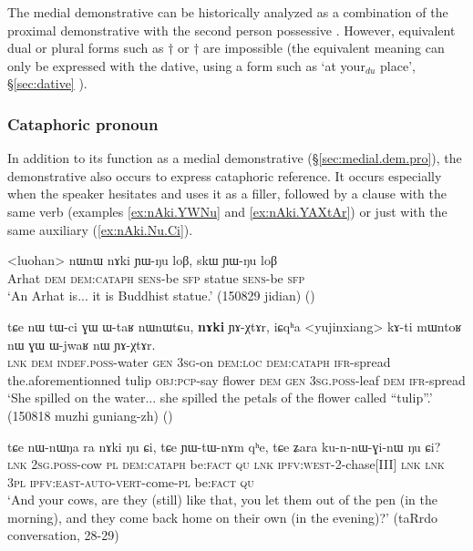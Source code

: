 The medial demonstrative  can be historically analyzed as a combination of the proximal demonstrative  with the second person possessive . However, equivalent dual or plural forms such as  $\dagger$ or $\dagger$ are impossible (the equivalent meaning can only be expressed with the dative, using a form such as  `at your$_{du}$ place', §\ref{sec:dative} ).


\subsubsection{Cataphoric pronoun}
\label{sec:cataph.pron}
In addition to its function as a medial demonstrative (§\ref{sec:medial.dem.pro}), the demonstrative  also occurs to express cataphoric reference. It occurs especially when the speaker hesitates and uses it as a filler, followed by a clause with the same verb (examples \ref{ex:nAki.YWNu} and \ref{ex:nAki.YAXtAr}) or just with the same auxiliary (\ref{ex:nAki.Nu.Ci}).

\begin{exe}
\ex \label{ex:nAki.YWNu}
 \gll <luohan> nɯnɯ nɤki ɲɯ-ŋu loβ, skɯ ɲɯ-ŋu loβ \\
 Arhat \textsc{dem} \textsc{dem}:\textsc{cataph} \textsc{sens}-be \textsc{sfp} statue \textsc{sens}-be \textsc{sfp} \\
\glt `An Arhat is... it is Buddhist statue.' (150829 jidian)
()
\end{exe}

\begin{exe}
\ex \label{ex:nAki.YAXtAr}
 \gll tɕe nɯ tɯ-ci ɣɯ ɯ-taʁ nɯnɯtɕu, \textbf{nɤki} ɲɤ-χtɤr, iɕqʰa <yujinxiang> kɤ-ti mɯntoʁ nɯ ɣɯ  ɯ-jwaʁ nɯ ɲɤ-χtɤr.  \\
\textsc{lnk} \textsc{dem} \textsc{indef}.\textsc{poss}-water \textsc{gen} \textsc{3sg}-on \textsc{dem}:\textsc{loc} \textsc{dem}:\textsc{cataph} \textsc{ifr}-spread the.aforementionned tulip \textsc{obj}:\textsc{pcp}-say flower \textsc{dem} \textsc{gen} \textsc{3sg}.\textsc{poss}-leaf \textsc{dem} \textsc{ifr}-spread \\
\glt `She spilled on the water...  she spilled the petals of the flower called ``tulip''.' (150818 muzhi guniang-zh) ()
\end{exe}

\begin{exe}
\ex \label{ex:nAki.Nu.Ci}
 \gll tɕe nɯ-nɯŋa ra nɤki ŋu ɕi, tɕe ɲɯ-tɯ-nɤm qʰe, tɕe ʑara ku-n-nɯ-ɣi-nɯ ŋu ɕi? \\
\textsc{lnk} \textsc{2sg}.\textsc{poss}-cow \textsc{pl} \textsc{dem}:\textsc{cataph} be:\textsc{fact} \textsc{qu} \textsc{lnk} \textsc{ipfv}:\textsc{west}-2-chase[III] \textsc{lnk} \textsc{lnk} \textsc{3pl} \textsc{ipfv}:\textsc{east}-\textsc{auto}-\textsc{vert}-come-\textsc{pl} be:\textsc{fact} \textsc{qu} \\
\glt `And your cows, are they (still) like that, you let them out of the pen (in the morning), and  they come back home on their own (in the evening)?' (taRrdo conversation, 28-29)
\end{exe}

